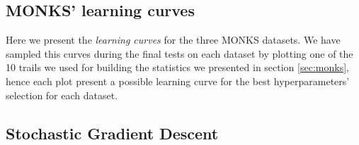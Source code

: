 \begin{appendices}
    \chapter{MONKS' learning curves} %
    \label{cha:monks_learning_curves}
        Here we present the \textit{learning curves} for the three MONKS datasets. We have sampled this curves
        during the final tests on each dataset by plotting one of the 10 trails we used for building the
        statistics we presented in section \ref{sec:monks}, hence each plot present a possible learning curve
        for the best hyperparameters' selection for each dataset.

        \section{Stochastic Gradient Descent} %
        \label{sec:stochastic_gradient_descent}


\end{appendices}
